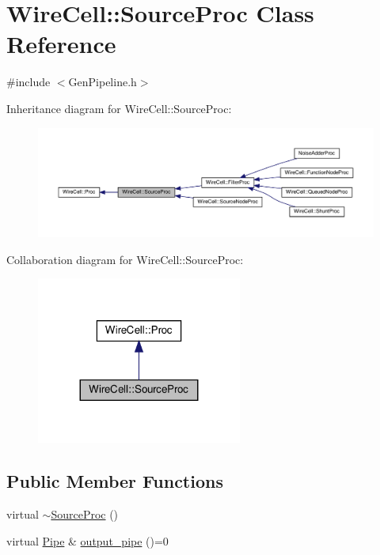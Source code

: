 \hypertarget{class_wire_cell_1_1_source_proc}{}\section{Wire\+Cell\+:\+:Source\+Proc Class Reference}
\label{class_wire_cell_1_1_source_proc}


{\ttfamily \#include $<$Gen\+Pipeline.\+h$>$}



Inheritance diagram for Wire\+Cell\+:\+:Source\+Proc\+:
\nopagebreak
\begin{figure}[H]
\begin{center}
\leavevmode
\includegraphics[width=350pt]{class_wire_cell_1_1_source_proc__inherit__graph}
\end{center}
\end{figure}


Collaboration diagram for Wire\+Cell\+:\+:Source\+Proc\+:
\nopagebreak
\begin{figure}[H]
\begin{center}
\leavevmode
\includegraphics[width=191pt]{class_wire_cell_1_1_source_proc__coll__graph}
\end{center}
\end{figure}
\subsection*{Public Member Functions}
\begin{DoxyCompactItemize}
\item 
virtual \hyperlink{class_wire_cell_1_1_source_proc_a752f9d797d4cd9d65ce24acad7b9296c}{$\sim$\+Source\+Proc} ()
\item 
virtual \hyperlink{namespace_wire_cell_afce9bb01c731347c3d4c8ca9d4ed804f}{Pipe} \& \hyperlink{class_wire_cell_1_1_source_proc_a480b8ba5e80e9e7c6ffdf0b5d9fd0578}{output\+\_\+pipe} ()=0
\end{DoxyCompactItemize}


